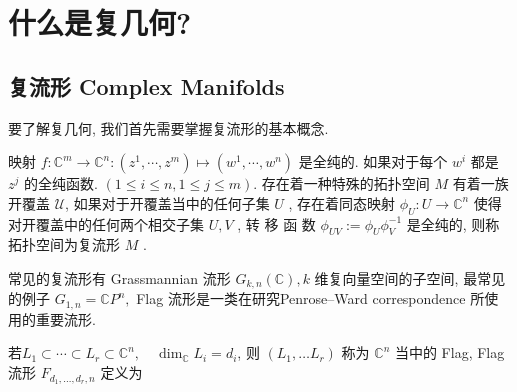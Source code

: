 \documentclass[UTF8,AutoFakeBold,scheme=chinese,eversion]{GXMU-Thesis}
\begin{document}
\author{陆世龙}
\subject{基础数学}
\subtitle{微分几何中的相关问题研究与说明}
\makecover
{\renewcommand\headrulewidth{0pt}
\fancyhead[C]{}


\originalitydeclaration %


}
\thesisfigurelist                                                      %
\thesistablelist                                                     %
\tableofcontents\clearpage  

\section{什么是复几何?}

\subsection{复流形 Complex Manifolds}
要了解复几何, 我们首先需要掌握复流形的基本概念\cite{Fujihechubujiqiwuliyingyong}. 

映射 $f: \mathbb{C}^m \rightarrow \mathbb{C}^n:\left(z^1, \cdots, z^m\right) \mapsto\left(w^1, \cdots, w^n\right)$ 是全纯的. 如果对于每个 $w^i$ 都是 $z^j$ 的全纯函数.  $(1 \leq i \leq n, 1 \leq j \leq m)$. 存在着一种特殊的拓扑空间 $M$ 有着一族开覆盖 $\mathcal{U}$, 如果对于开覆盖当中的任何子集 $U$ ,  存在着同态映射 $\phi_U: U \rightarrow \mathbb{C}^n$ 使得对开覆盖中的任何两个相交子集 $U ,  V$  ,  转 移 函 数 $ \phi_{U V}:=\phi_U \phi_V^{-1}$ 是全纯的,  则称拓扑空间为复流形 $M$ . 

常见的复流形有 Grassmannian 流形 $G_{k, n}(\mathbb{C}) ,  k$ 维复向量空间的子空间, 最常见的例子 $G_{1, n}=\mathbb{C} P^n , $ Flag 流形是一类在研究Penrose--Ward correspondence 所使用的重要流形. 

若$L_1 \subset \cdots \subset L_r \subset \mathbb{C}^n, \quad \operatorname{dim}_{\mathbb{C}} L_i=d_i$, 则 $\left(L_1, \ldots L_r\right)$ 称为 $\mathbb{C}^n$ 当中的 Flag, Flag 流形 $F_{d_1, \ldots, d_r, n}$ 定义为 
\end{document}

